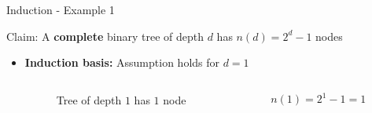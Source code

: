 \begin{frame}{Induction - Example 1}
  \begin{block}{Claim:}
    A \textbf{complete} binary tree of depth $d$ has $n(d) = 2^d - 1$ nodes
  \end{block}
  \begin{itemize}
    \item<2- |handout:1>
      \textbf{Induction basis:} Assumption holds for {\color{MainA}$d = 1$}
      \begin{columns}
        \begin{column}{0.5\linewidth}
          \begin{figure}[!h]
            \begin{adjustbox}{width=4em}
              
            \end{adjustbox}
            \caption{Tree of depth {\color{MainA}$1$} has
              {\color{MainA}$1$} node}
          \end{figure}
        \end{column}
        \begin{column}{0.5\linewidth}
          {\color{MainA}$n(1) = 2^1 - 1 = 1$}\\
        \end{column}
      \end{columns}
  \end{itemize}
\end{frame}


